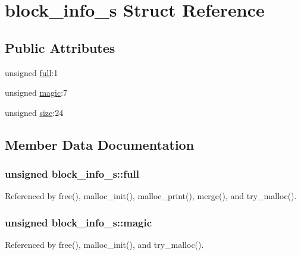 \hypertarget{structblock__info__s}{\section{block\-\_\-info\-\_\-s Struct Reference}
\label{structblock__info__s}
}
\subsection*{Public Attributes}
\begin{DoxyCompactItemize}
\item 
unsigned \hyperlink{structblock__info__s_a630efa05da2102ab8ea4f41836e8fdf1}{full}\-:1
\item 
unsigned \hyperlink{structblock__info__s_ac16e3bd98da13d928f64af612e8f8c40}{magic}\-:7
\item 
unsigned \hyperlink{structblock__info__s_ac5d895bc19d09c9bb8dc9dafea66e159}{size}\-:24
\end{DoxyCompactItemize}


\subsection{Member Data Documentation}
\hypertarget{structblock__info__s_a630efa05da2102ab8ea4f41836e8fdf1}{
\subsubsection[{full}]{\setlength{\rightskip}{0pt plus 5cm}unsigned block\-\_\-info\-\_\-s\-::full}}\label{structblock__info__s_a630efa05da2102ab8ea4f41836e8fdf1}


Referenced by free(), malloc\-\_\-init(), malloc\-\_\-print(), merge(), and try\-\_\-malloc().

\hypertarget{structblock__info__s_ac16e3bd98da13d928f64af612e8f8c40}{
\subsubsection[{magic}]{\setlength{\rightskip}{0pt plus 5cm}unsigned block\-\_\-info\-\_\-s\-::magic}}\label{structblock__info__s_ac16e3bd98da13d928f64af612e8f8c40}


Referenced by free(), malloc\-\_\-init(), and try\-\_\-malloc().

